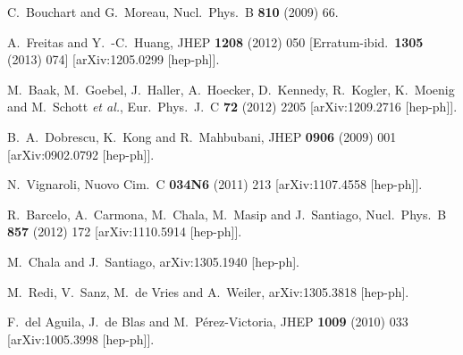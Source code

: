\documentclass[12pt,a4paper]{article}
\begin{document}
\begin{thebibliography}{99}
  C.~Bouchart and G.~Moreau,
  Nucl.\ Phys.\ B {\bf 810} (2009) 66.

  A.~Freitas and Y.~-C.~Huang,
  JHEP {\bf 1208} (2012) 050
   [Erratum-ibid.\  {\bf 1305} (2013) 074]
  [arXiv:1205.0299 [hep-ph]].

  M.~Baak, M.~Goebel, J.~Haller, A.~Hoecker, D.~Kennedy, R.~Kogler, K.~Moenig and M.~Schott {\it et al.},
  Eur.\ Phys.\ J.\ C {\bf 72} (2012) 2205
  [arXiv:1209.2716 [hep-ph]].

  B.~A.~Dobrescu, K.~Kong and R.~Mahbubani,
  JHEP {\bf 0906} (2009) 001
  [arXiv:0902.0792 [hep-ph]].

  N.~Vignaroli,
  Nuovo Cim.\ C {\bf 034N6} (2011) 213
  [arXiv:1107.4558 [hep-ph]].

  R.~Barcelo, A.~Carmona, M.~Chala, M.~Masip and J.~Santiago,
  Nucl.\ Phys.\ B {\bf 857} (2012) 172
  [arXiv:1110.5914 [hep-ph]].

  M.~Chala and J.~Santiago,
  arXiv:1305.1940 [hep-ph].

  M.~Redi, V.~Sanz, M.~de Vries and A.~Weiler,
  arXiv:1305.3818 [hep-ph].

  F.~del Aguila, J.~de Blas and M.~P\'erez-Victoria,
  JHEP {\bf 1009} (2010) 033
  [arXiv:1005.3998 [hep-ph]].

\end{thebibliography}
\end{document}

